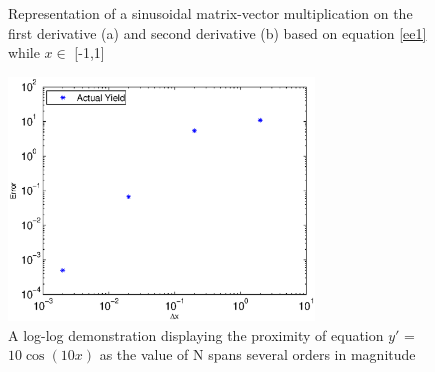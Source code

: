 \documentclass[12pt]{article}
\begin{document}
\begin{landscape}
\begin{figure}[ht]
\begin{center}
\end{center}
\caption{Representation of a sinusoidal matrix-vector multiplication on the first derivative (a) and second derivative (b) based on equation \ref{ee1} while $x \in$ [-1,1]}
\label{fig:subfig}
\end{figure}
\end{landscape}
\begin{landscape}
\begin{figure}[ht]
\begin{center}
\includegraphics[width=3.2in]{graph3.eps}
\caption{A log-log demonstration displaying the proximity of equation $y'$ = $10\cos(10x)$ as the value of N spans several orders in magnitude}
\label{fig3}
\end{center}
\end{figure}
\end{landscape}
\end{document}
